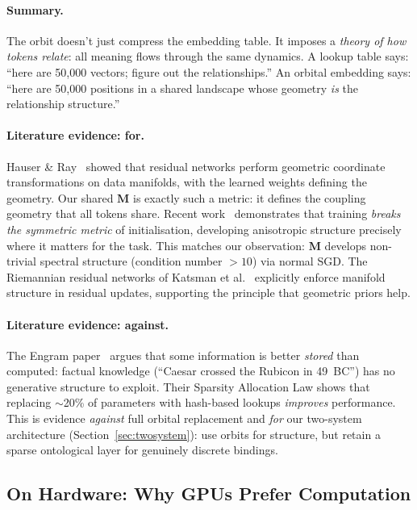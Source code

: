 \documentclass[11pt, a4paper]{article}
\newcommand{\M}{\mathbf{M}}
\theoremstyle{remark}
\begin{document}
\paragraph{Summary.}
The orbit doesn't just compress the embedding table.
It imposes a \emph{theory of how tokens relate}: all meaning flows through the same dynamics.
A lookup table says: ``here are 50,000 vectors; figure out the relationships.''
An orbital embedding says: ``here are 50,000 positions in a shared landscape whose geometry \emph{is} the relationship structure.''

\paragraph{Literature evidence: for.}
Hauser \& Ray~\cite{hauser2017riemannian} showed that residual networks perform geometric coordinate transformations on data manifolds, with the learned weights defining the geometry.
Our shared $\M$ is exactly such a metric: it defines the coupling geometry that all tokens share.
Recent work~\cite{training2023geometry} demonstrates that training \emph{breaks the symmetric metric} of initialisation, developing anisotropic structure precisely where it matters for the task.
This matches our observation: $\M$ develops non-trivial spectral structure (condition number $> 10$) via normal SGD.
The Riemannian residual networks of Katsman et al.~\cite{katsman2023riemannian} explicitly enforce manifold structure in residual updates, supporting the principle that geometric priors help.

\paragraph{Literature evidence: against.}
The Engram paper~\cite{engram2026} argues that some information is better \emph{stored} than computed: factual knowledge (``Caesar crossed the Rubicon in 49~BC'') has no generative structure to exploit.
Their Sparsity Allocation Law shows that replacing $\sim$20\% of parameters with hash-based lookups \emph{improves} performance.
This is evidence \emph{against} full orbital replacement and \emph{for} our two-system architecture (Section~\ref{sec:twosystem}): use orbits for structure, but retain a sparse ontological layer for genuinely discrete bindings.

\subsection{On Hardware: Why GPUs Prefer Computation}
\end{document}
